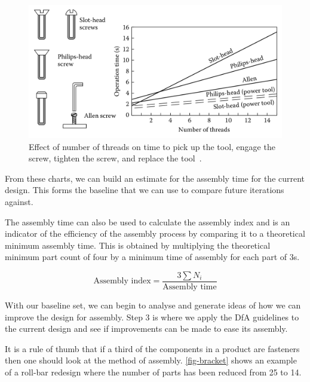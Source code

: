 \begin{figure}
    \centering
    \includegraphics[width=\textwidth]{07_design_for_x/screwing.png}
    \caption[Effect of number of threads on time to pick up the tool, engage the screw, tighten the screw, and replace the tool]{Effect of number of threads on time to pick up the tool, engage the screw, tighten the screw, and replace the tool~\citep{boothroyd2011}.}\label{fig-screw}
\end{figure}


From these charts, we can build an estimate for the assembly time for the current design. This forms the baseline that we can use to compare future iterations against.

 The assembly time can also be used to calculate the assembly index and is an indicator of the efficiency of the assembly process by comparing it to a theoretical minimum assembly time. This is obtained by multiplying the theoretical minimum part count of four by a minimum time of assembly for each part of 3s. 

\begin{equation}
  \text{Assembly index} = \frac{3\sum{N_i}}{\text{Assembly time}}
\end{equation}


With our baseline set, we can begin to analyse and generate ideas of how we can improve the design for assembly. Step 3 is where we apply the \ac{DfA} guidelines to the current design and see if improvements can be made to ease its assembly.

It is a rule of thumb that if a third of the components in a product are fasteners then one should look at the method of assembly. \cref{fig-bracket} shows an example of a roll-bar redesign where the number of parts has been reduced from 25 to 14.

